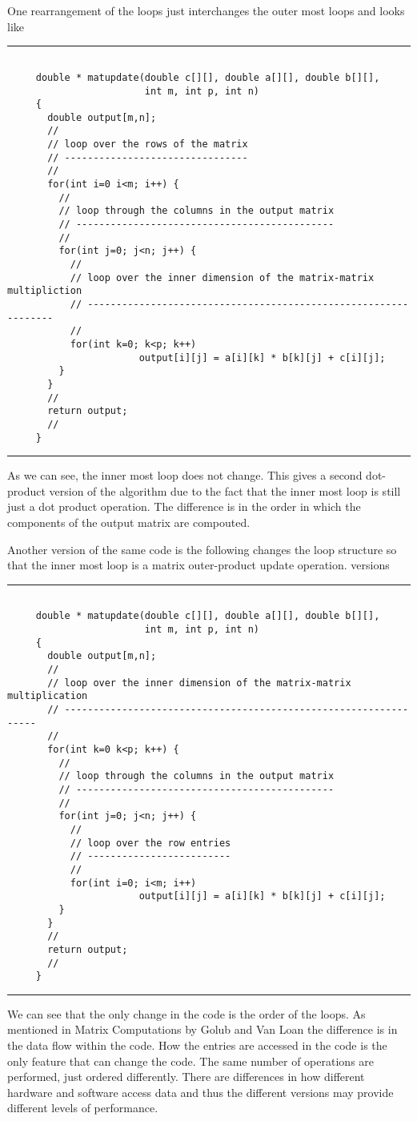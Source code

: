 \documentclass[10pt,fleqn]{article}
\begin{document}
One rearrangement of the loops just interchanges the outer most loops and looks
like
\vskip0.1in\hrule\vskip0.1in
\begin{verbatim}

     double * matupdate(double c[][], double a[][], double b[][],
                        int m, int p, int n)
     {
       double output[m,n];
       //
       // loop over the rows of the matrix
       // --------------------------------
       //
       for(int i=0 i<m; i++) {
         //
         // loop through the columns in the output matrix
         // ---------------------------------------------
         //
         for(int j=0; j<n; j++) {
           //
           // loop over the inner dimension of the matrix-matrix multipliction
           // ----------------------------------------------------------------
           //
           for(int k=0; k<p; k++)
                       output[i][j] = a[i][k] * b[k][j] + c[i][j];
         }
       }
       //
       return output;
       //
     }

\end{verbatim}
\vskip0.1in\hrule\vskip0.1in
\noindent
As we can see, the inner most loop does not change. This gives a second
dot-product version of the algorithm due to the fact that the inner most loop is
still just a dot product operation. The difference is in the order in which the
components of the output matrix are compouted.

Another version of the same code is the following changes the loop structure so
that the inner most loop is a matrix outer-product update operation. 
versions
\vskip0.1in\hrule\vskip0.1in
\begin{verbatim}

     double * matupdate(double c[][], double a[][], double b[][],
                        int m, int p, int n)
     {
       double output[m,n];
       //
       // loop over the inner dimension of the matrix-matrix multiplication
       // -----------------------------------------------------------------
       //
       for(int k=0 k<p; k++) {
         //
         // loop through the columns in the output matrix
         // ---------------------------------------------
         //
         for(int j=0; j<n; j++) {
           //
           // loop over the row entries
           // -------------------------
           //
           for(int i=0; i<m; i++)
                       output[i][j] = a[i][k] * b[k][j] + c[i][j];
         }
       }
       //
       return output;
       //
     }

\end{verbatim}
\vskip0.1in\hrule\vskip0.1in
\noindent
We can see that the only change in the code is the order of the loops. As
mentioned in Matrix Computations by Golub and Van Loan the difference is in the
data flow within the code. How the entries are accessed in the code is the only
feature that can change the code. The same number of operations are performed,
just ordered differently. There are differences in how different hardware and
software access data and thus the different versions may provide different
levels of performance.
\end{document}
